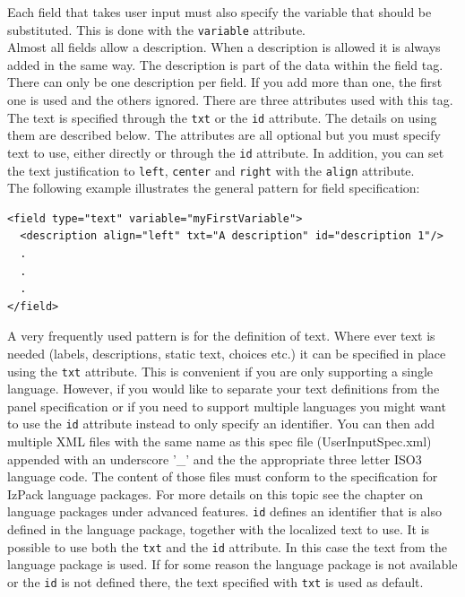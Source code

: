 Each field that takes user input must also specify the variable that
should be substituted. This is done with the \texttt{variable}
attribute.\\

\label{userInput:descriptiontag}
Almost all fields allow a description. When a description is allowed it
is always added in the same way. The description is part of the data
within the field tag. There can only be one description per field. If
you add more than one, the first one is used and the others ignored.
There are three attributes used with this tag. The text is specified
through the \texttt{txt} or the \texttt{id} attribute. The details on
using them are described below. The attributes are all optional but you
must specify text to use, either directly or through the \texttt{id}
attribute. In addition, you can set the text justification to
\texttt{left}, \texttt{center} and \texttt{right} with the
\texttt{align} attribute. \\

The following example illustrates the general pattern for field specification:\\

\footnotesize
\begin{verbatim}
<field type="text" variable="myFirstVariable">
  <description align="left" txt="A description" id="description 1"/>
  .
  .
  .
</field>
\end{verbatim}
\normalsize

A very frequently used pattern is for the definition of text. Where ever
text is needed (labels, descriptions, static text, choices etc.) it can
be specified in place using the \texttt{txt} attribute. This is
convenient if you are only supporting a single language. However, if you
would like to separate your text definitions from the panel
specification or if you need to support multiple languages you might
want to use the \texttt{id} attribute instead to only specify an
identifier. You can then add multiple XML files with the same name as
this spec file (UserInputSpec.xml) appended with an underscore '\_' and
the the appropriate three letter ISO3 language code. The content of
those files must conform to the specification for IzPack language
packages. For more details on this topic see the chapter on language
packages under advanced features. \texttt{id} defines an identifier that
is also defined in the language package, together with the localized
text to use. It is possible to use both the \texttt{txt} and the
\texttt{id} attribute. In this case the text from the language package
is used. If for some reason the language package is not available or the
\texttt{id} is not defined there, the text specified with \texttt{txt}
is used as default.\\

